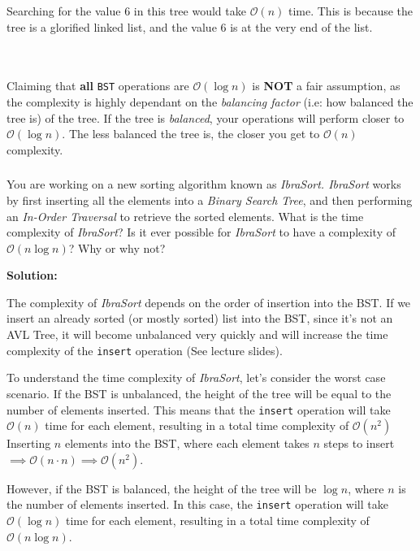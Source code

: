 \documentclass[12pt]{article}
\begin{document}
    Searching for the value $6$ in this tree would take $\mathcal{O}(n)$ time. This is because the tree is a glorified linked list, and the value $6$ is at the very end of the list.

    \\ \\

    Claiming that \textbf{all} \texttt{BST} operations are $\mathcal{O}(\log n)$ is \textbf{NOT} a fair assumption, as the complexity is highly dependant on the \textit{balancing factor} \left(i.e: how balanced the tree is\right) of the tree. If the tree is \textit{balanced}, your operations will perform closer to $\mathcal{O}(\log n)$. The less balanced the tree is, the closer you get to $\mathcal{O}(n)$ complexity. 

    \clearpage
    \subsubsection{}
    You are working on a new sorting algorithm known as \textit{IbraSort. IbraSort} works by first inserting all the elements into a \textit{Binary Search Tree}, and then performing an \textit{In-Order Traversal} to retrieve the sorted elements. What is the time complexity of \textit{IbraSort}? Is it ever possible for \textit{IbraSort} to have a complexity of $\mathcal{O}(n \log n)$? Why or why not?\\

    \vspace{1cm}

    \textbf{Solution:}

    The complexity of \textit{IbraSort} depends on the order of insertion into the BST. If we insert an already sorted (or mostly sorted) list into the BST, since it's not an AVL Tree, it will become unbalanced very quickly and will increase the time complexity of the \texttt{insert} operation (See lecture slides).

    To understand the time complexity of \textit{IbraSort}, let's consider the worst case scenario. If the BST is unbalanced, the height of the tree will be equal to the number of elements inserted. This means that the \texttt{insert} operation will take $\mathcal{O}(n)$ time for each element, resulting in a total time complexity of $\mathcal{O}(n^2)$ Inserting $n$ elements into the BST, where each element takes $n$ steps to insert $\implies \mathcal{O}(n \cdot n) \implies \mathcal{O}(n^2)$.

    However, if the BST is balanced, the height of the tree will be $\log n$, where $n$ is the number of elements inserted. In this case, the \texttt{insert} operation will take $\mathcal{O}(\log n)$ time for each element, resulting in a total time complexity of $\mathcal{O}(n \log n)$.
    
\end{document}

